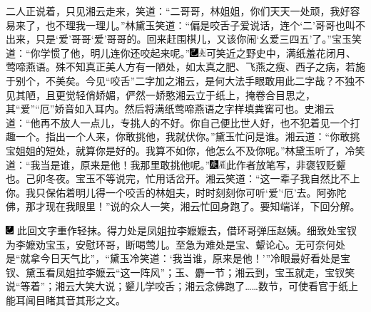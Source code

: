 二人正说着，只见湘云走来，笑道：“二哥哥，林姐姐，你们天天一处顽，我好容易来了，也不理我一理儿。”林黛玉笑道：“偏是咬舌子爱说话，连个‘二’哥哥也叫不出来，只是‘爱’哥哥‘爱’哥哥的。回来赶围棋儿，又该你闹‘幺爱三四五’了。”宝玉笑道：“你学惯了他，明儿连你还咬起来呢。”{\includegraphics[width=3mm]{../Images/00003}\includegraphics[width=3mm]{../Images/00012}\footnotesize \kaishu 可笑近之野史中，满纸羞花闭月、莺啼燕语。殊不知真正美人方有一陋处，如太真之肥、飞燕之瘦、西子之病，若施于别个，不美矣。今见“咬舌”二字加之湘云，是何大法手眼敢用此二字哉？不独不见其陋，且更觉轻俏娇媚，俨然一娇憨湘云立于纸上，掩卷合目思之，其“爱”“厄”娇音如入耳内。然后将满纸莺啼燕语之字样填粪窖可也。}史湘云道：“他再不放人一点儿，专挑人的不好。你自己便比世人好，也不犯着见一个打趣一个。指出一个人来，你敢挑他，我就伏你。”黛玉忙问是谁。湘云道：“你敢挑宝姐姐的短处，就算你是好的。我算不如你，他怎么不及你呢。”林黛玉听了，冷笑道：“我当是谁，原来是他！我那里敢挑他呢。”{\includegraphics[width=3mm]{../Images/00004}\includegraphics[width=3mm]{../Images/00010}\footnotesize \kaishu 此作者放笔写，非褒钗贬颦也。己卯冬夜。}宝玉不等说完，忙用话岔开。湘云笑道：“这一辈子我自然比不上你。我只保佑着明儿得一个咬舌的林姐夫，时时刻刻你可听‘爱’‘厄’去。阿弥陀佛，那才现在我眼里！”说的众人一笑，湘云忙回身跑了。要知端详，下回分解。

{\includegraphics[width=3mm]{../Images/00003}  \kaishu 此回文字重作轻抹。得力处是凤姐拉李嬷嬷去，借环哥弹压赵姨。细致处宝钗为李嬷劝宝玉，安慰环哥，断喝莺儿。至急为难处是宝、颦论心。无可奈何处是“就拿今日天气比”，“黛玉冷笑道：‘我当谁，原来是他！’”冷眼最好看处是宝钗、黛玉看凤姐拉李嬷云“这一阵风”；玉、麝一节；湘云到，宝玉就走，宝钗笑说“等着”；湘云大笑大说；颦儿学咬舌；湘云念佛跑了\ldots{}\ldots{}数节，可使看官于纸上能耳闻目睹其音其形之文。}
